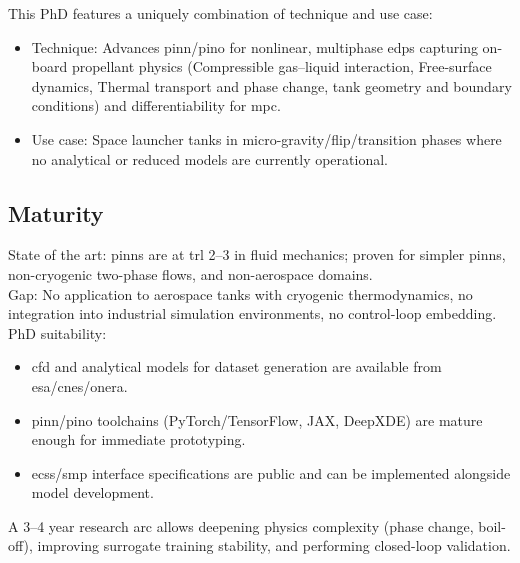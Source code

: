 \documentclass[12pt]{article}
\begin{document}
	This PhD features a uniquely combination of technique and use case:
	
	\begin{itemize}
		\item Technique: Advances \acrshort{pinn}/\acrshort{pino} for nonlinear, multiphase \acrshort{edps} capturing on-board propellant physics (Compressible gas–liquid interaction, Free-surface dynamics, Thermal transport and phase change, tank geometry and boundary conditions) and differentiability for \gls{mpc}.
		
		\item Use case: Space launcher tanks in micro-gravity/flip/transition phases where no analytical or reduced models are currently operational.
	\end{itemize}
	
	\subsection*{Maturity}
	
	
	State of the art: \acrshort{pinn}s are at \acrshort{trl} 2–3 in fluid mechanics; proven for simpler \acrshort{pinn}s, non-cryogenic two-phase flows, and non-aerospace domains.
	\\
	
	Gap: No application to aerospace tanks with cryogenic thermodynamics, no integration into industrial simulation environments, no control-loop embedding.
	\\
		
	PhD suitability:
	
	\begin{itemize}
		\item \acrshort{cfd} and analytical models for dataset generation are available from \acrshort{esa}/\acrshort{cnes}/\acrshort{onera}.
		
		\item \acrshort{pinn}/\acrshort{pino} toolchains (PyTorch/TensorFlow, JAX, DeepXDE) are mature enough for immediate prototyping.
		
		\item \acrshort{ecss}/\acrshort{smp} interface specifications are public and can be implemented alongside model development.
		
	\end{itemize}	
	A 3–4 year research arc allows deepening physics complexity (phase change, boil-off), improving surrogate training stability, and performing closed-loop validation.
	
\end{document}
